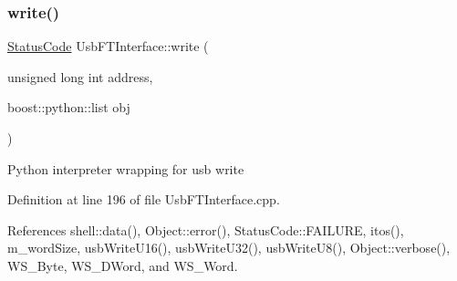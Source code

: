 \mbox{\label{classUsbFTInterface_a2efbde3a31cdbe44a3cbd66da6592870}} 
\subsubsection{\texorpdfstring{write()}{write()}\hspace{0.1cm}{\footnotesize\ttfamily [2/2]}}
{\footnotesize\ttfamily \hyperlink{classStatusCode}{Status\+Code} Usb\+F\+T\+Interface\+::write (\begin{DoxyParamCaption}\item[{unsigned long int}]{address,  }\item[{boost\+::python\+::list}]{obj }\end{DoxyParamCaption})}

Python interpreter wrapping for usb write 

Definition at line 196 of file Usb\+F\+T\+Interface.\+cpp.



References shell\+::data(), Object\+::error(), Status\+Code\+::\+F\+A\+I\+L\+U\+RE, itos(), m\+\_\+word\+Size, usb\+Write\+U16(), usb\+Write\+U32(), usb\+Write\+U8(), Object\+::verbose(), W\+S\+\_\+\+Byte, W\+S\+\_\+\+D\+Word, and W\+S\+\_\+\+Word.


